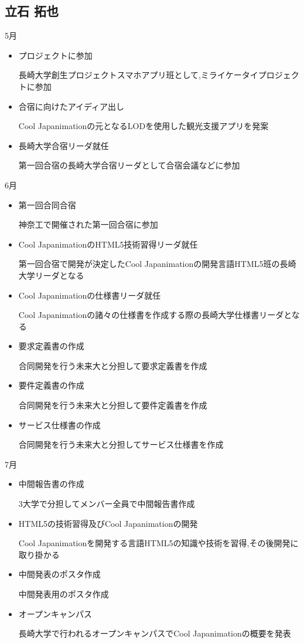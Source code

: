 \subsection{立石 拓也}
5月
\begin{itemize}
\item プロジェクトに参加
\par 長崎大学創生プロジェクトスマホアプリ班として,ミライケータイプロジェクトに参加
\item 合宿に向けたアイディア出し
\par Cool Japanimationの元となるLODを使用した観光支援アプリを発案
\item 長崎大学合宿リーダ就任
\par 第一回合宿の長崎大学合宿リーダとして合宿会議などに参加
\end{itemize}
6月
\begin{itemize}
\item 第一回合同合宿
\par 神奈工で開催された第一回合宿に参加
\item Cool JapanimationのHTML5技術習得リーダ就任
\par 第一回合宿で開発が決定したCool Japanimationの開発言語HTML5班の長崎大学リーダとなる
\item Cool Japanimationの仕様書リーダ就任
\par Cool Japanimationの諸々の仕様書を作成する際の長崎大学仕様書リーダとなる
\item 要求定義書の作成
\par 合同開発を行う未来大と分担して要求定義書を作成
\item 要件定義書の作成
\par 合同開発を行う未来大と分担して要件定義書を作成
\item サービス仕様書の作成
\par 合同開発を行う未来大と分担してサービス仕様書を作成
\end{itemize}
7月
\begin{itemize}
\item 中間報告書の作成
\par 3大学で分担してメンバー全員で中間報告書作成
\item HTML5の技術習得及びCool Japanimationの開発
\par Cool Japanimationを開発する言語HTML5の知識や技術を習得,その後開発に取り掛かる
\item 中間発表のポスタ作成
\par 中間発表用のポスタ作成
\item オープンキャンパス
\par 長崎大学で行われるオープンキャンパスでCool Japanimationの概要を発表
\end{itemize}
